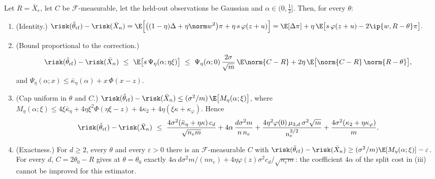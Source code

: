\begin{theorem}\label{thm:refit}
Let $R=\bar X_e$, let $C$ be $\mathcal F$-measurable, let the held-out observations be Gaussian and $\alpha\in(0,\tfrac12]$. Then, for every $\theta$:
\begin{enumerate}[leftmargin=2em,label=(\roman*)]
\item \textup{(Identity.)}
$\displaystyle \risk(\hat\theta_{\rm rf})-\risk(\bar X_n)=\E\Big[\big((1-\eta)\Delta+\eta\norm w^2\big)\pi+\eta\,s\,\varphi(z+u)\Big]
=\E[\Delta\pi]+\eta\,\E\big[s\,\varphi(z+u)-2\ip{w,R-\theta}\pi\big].$
\item \textup{(Bound proportional to the correction.)}
\[
\risk(\hat\theta_{\rm rf})-\risk(\bar X_n)\ \le\ \E\big[s\,\Psi_\eta(\alpha;\eta\xi)\big]
\ \le\ \Psi_\eta(\alpha;0)\,\frac{2\sigma}{\sqrt m}\,\E\norm{C-R}+2\eta\,\E\big[\norm{C-R}\,\norm{R-\theta}\big],
\]
and $\Psi_\eta(\alpha;x)\le\bar\kappa_\eta(\alpha)+x\,\Phi(x-z)$.
\item \textup{(Cap uniform in $\theta$ and $C$.)} $\risk(\hat\theta_{\rm rf})-\risk(\bar X_n)\le(\sigma^2/m)\,\E\big[M_\eta(\alpha;\xi)\big]$, where $M_\eta(\alpha;\xi)\le4\xi\bar\kappa_\eta+4\eta\xi^2\Phi(\eta\xi-z)+4\kappa_2+4\eta(\xi\kappa+\kappa_\varphi)$. Hence
\[
\risk(\hat\theta_{\rm rf})-\risk(\bar X_n)\ \le\ \frac{4\sigma^2(\bar\kappa_\eta+\eta\kappa)\,c_d}{\sqrt{n_e m}}
+4\alpha\,\frac{d\sigma^2 m}{n\,n_e}
+\frac{4\eta^2\varphi(0)\,\mu_{3,d}\,\sigma^2\sqrt m}{n_e^{3/2}}
+\frac{4\sigma^2(\kappa_2+\eta\kappa_\varphi)}{m}.
\]
\item \textup{(Exactness.)} For $d\ge2$, every $\theta$ and every $\varepsilon>0$ there is an $\mathcal F$-measurable $C$ with $\risk(\hat\theta_{\rm rf})-\risk(\bar X_n)\ge(\sigma^2/m)\E[M_\eta(\alpha;\xi)]-\varepsilon$. For every $d$, $C=2\theta_0-R$ gives at $\theta=\theta_0$ exactly $4\alpha\,d\sigma^2m/(nn_e)+4\eta\varphi(z)\sigma^2c_d/\sqrt{n_em}$: the coefficient $4\alpha$ of the split cost in (iii) cannot be improved for this estimator.
\end{enumerate}
\end{theorem}


